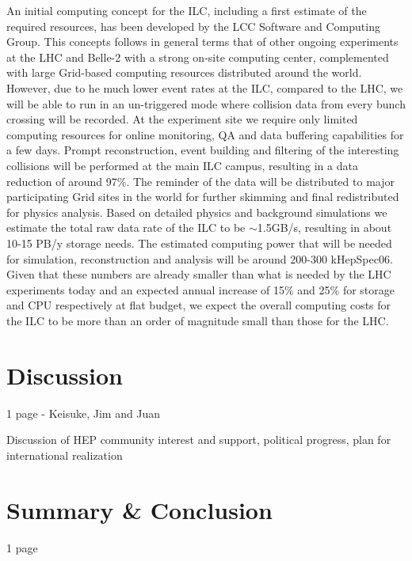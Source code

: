 \documentclass[%
 reprint,
 amsmath,amssymb,
 aps,
]{revtex4-1}
\begin{document}
  
An initial computing concept for the ILC, including a first estimate of the required resources, has been developed by the LCC Software and Computing Group.
This concepts follows in general terms that of other ongoing experiments at the LHC and Belle-2 with a strong on-site computing center, complemented with large
Grid-based computing resources distributed around the world. However, due to he much lower event rates at the ILC, compared to the LHC, we will be
able to run in an un-triggered mode where collision data from every bunch crossing will be recorded. At the experiment site we require only limited computing
resources for online monitoring, QA and data buffering capabilities for a few days. Prompt reconstruction, event building and filtering of the interesting collisions
will be performed at the main ILC campus, resulting in a data reduction of around 97\%. The reminder of the data will be distributed to major participating Grid sites
in the world for further skimming and final redistributed for physics analysis.
Based on detailed physics and background simulations we estimate the total raw data rate of the ILC to be $\sim$1.5GB/s, resulting in about 10-15 PB/y storage needs.
The estimated computing power that will be needed for simulation, reconstruction and analysis will be around 200-300 kHepSpec06.
Given that these numbers are already smaller than what is needed by the LHC experiments today and an expected annual increase of 15\% and 25\% for storage and CPU
respectively at flat budget, we expect the overall computing costs for the ILC to be more than an order of magnitude small than those for the LHC.

\section{\label{sec:discuss}Discussion}

1 page - Keisuke, Jim and Juan

    Discussion of HEP community interest and support, political progress, plan for international realization

\section{\label{sec:sum}Summary \& Conclusion} 

1 page
\end{document}
